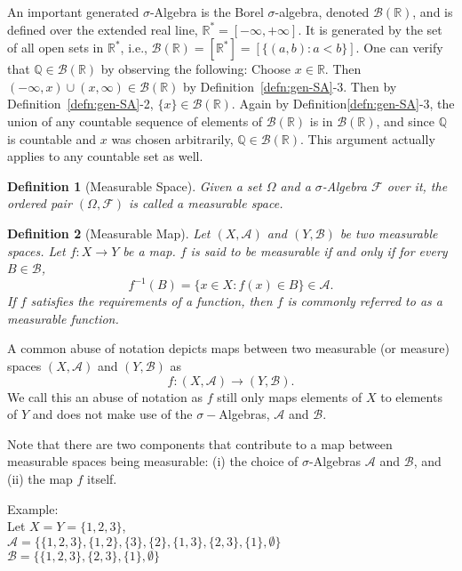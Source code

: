 \documentclass[10pt, oneside]{article}
\newcommand{\R}{\mathbb{R}}
\newcommand{\Q}{\mathbb{Q}}
\newtheorem{defn}{Definition}
\begin{document}
An important generated $\sigma$-Algebra is the Borel $\sigma$-algebra, denoted 
$\mathcal{B}(\R)$, and is defined over the extended real line, $\R^{*} = [-\infty,
+\infty]$. It is generated by the set of all open sets in $\R^{*}$, i.e., 
$\mathcal{B}(\R) = [\R^{*}]=[\{(a,b):a<b\}]$. 
One can verify that $\Q\in \mathcal{B}(\R)$ by observing the following: Choose $x\in \R$. 
Then $(-\infty,x)\cup(x,\infty)\in \mathcal{B}(\R)$ by Definition~\ref{defn:gen-SA}-3.
Then by Definition~\ref{defn:gen-SA}-2, $\{x\}\in \mathcal{B}(\R)$.
Again by Definition\ref{defn:gen-SA}-3, the union of any countable sequence of elements of $\mathcal{B}(\R)$ is in $\mathcal{B}(\R)$, and since $\Q$ is countable and $x$ was chosen arbitrarily, $\Q\in \mathcal{B}(\R)$.
This argument actually applies to any countable set as well.

\begin{defn}[Measurable Space]
    \label{defn:space}
    Given a set $\Omega$ and a $\sigma$-Algebra $\mathcal{F}$ over it, the ordered 
    pair $(\Omega,\mathcal{F})$ is called a measurable space. 
\end{defn}

\begin{defn}[Measurable Map]
    \label{defn:map}
    Let $(X,\mathcal{A})$ and $(Y,\mathcal{B})$ be two measurable spaces. Let 
    $f \colon X \to Y$ be a map. $f$ is said to be measurable if and only if 
    for every $B \in \mathcal{B}$, 
    \[f^{-1}(B) = \{x \in X \colon f(x) \in B\} \in \mathcal{A}.\]
    If $f$ satisfies the requirements of a function, then $f$ is commonly referred 
    to as a measurable function. 
\end{defn}
A common abuse of notation depicts maps between two measurable (or measure) spaces 
$(X,\mathcal{A})$ and $(Y, \mathcal{B})$ as 
\[f \colon (X,\mathcal{A}) \to (Y,\mathcal{B}). \]
We call this an abuse of notation as $f$ still only maps elements of $X$ to elements
of $Y$ and does not make use of the $\sigma-$Algebras, $\mathcal{A}$ and $\mathcal{B}$. 

Note that there are two components that contribute to a map between measurable spaces
being measurable: (i) the choice of $\sigma$-Algebras $\mathcal{A}$ and $\mathcal{B}$,
and (ii) the map $f$ itself. 

Example:\\ Let $X=Y=\{1,2,3\}$, \\$\mathcal{A}=\{\{1,2,3\},\{1,2\},\{3\},\{2\},\{1,3\},\{2,3\},\{1\},\emptyset\}$ \\ $\mathcal{B}=\{\{1,2,3\},\{2,3\},\{1\},\emptyset\}$ \\
\end{document}
